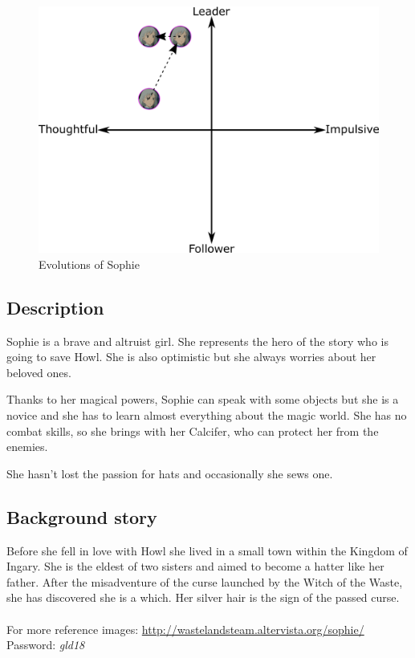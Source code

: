 \begin{figure}[H]
  \centering
  \includegraphics[width=14cm]{Images/Diagrams/Evolutions/sophieEvolution}
  \caption{Evolutions of Sophie}
\end{figure}

\subsection{Description}
Sophie is a brave and altruist girl. She represents the hero of the story who is going to save Howl. She is also optimistic but she always worries about her beloved ones.

Thanks to her magical powers, Sophie can speak with some objects but she is a novice and she has to learn almost everything about the magic world. She has no combat skills, so she brings with her Calcifer, who can protect her from the enemies.

She hasn't lost the passion for hats and occasionally she sews one.

\subsection{Background story}
Before she fell in love with Howl she lived in a small town within the Kingdom of Ingary. She is the eldest of two sisters and aimed to become a hatter like her father. After the misadventure of the curse launched by the Witch of the Waste, she has discovered she is a which. Her silver hair is the sign of the passed curse.\\\\
For more reference images: \url{http://wastelandsteam.altervista.org/sophie/}\\
Password: \textit{gld18}
